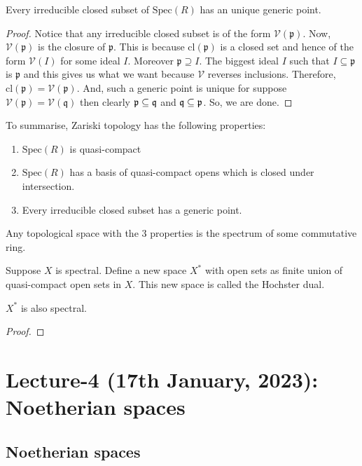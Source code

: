 \documentclass[oneside, 12pt, ]{scrbook}
\newcommand{\V}{\mathcal{V}}
\newcommand{\spec}{\mathrm{Spec}}
\newcommand{\pr}{\mathfrak{p}}
\theoremstyle{theorem}
\begin{document}
\begin{proposition}
Every irreducible closed subset of $\spec(R)$ has an unique generic point.
\end{proposition}

\begin{proof}
Notice that any irreducible closed subset is of the form $\V(\pr)$. Now, $\V(\pr)$ is the closure of $\pr$. This is because $\mathrm{cl}(\pr)$ is a closed set and hence of the form $\V(I)$ for some ideal $I$. Moreover $\pr \supseteq I$. The biggest ideal $I$ such that $I \subseteq \pr$ is $\pr$ and this gives us what we want because $\V$ reverses inclusions. Therefore, $\mathrm{cl}(\pr) = \V(\pr)$. And, such a generic point is unique for suppose $\V(\pr) = \V(\mathfrak{q})$ then clearly $\pr \subseteq \frak{q}$ and $\frak{q} \subseteq \pr$. So, we are done. 
\end{proof}

To summarise, Zariski topology has the following properties: 
\begin{enumerate}
\item $\spec(R)$ is quasi-compact
\item $\spec(R)$ has a basis of quasi-compact opens which is closed under intersection.
\item Every irreducible closed subset has a generic point.
\end{enumerate}

\begin{theorem}[Hochster]
Any topological space with the $3$ properties is the spectrum of some commutative ring.
\end{theorem}



Suppose $X$ is spectral. Define a new space $X^{*}$ with open sets as finite union of quasi-compact open sets in $X$. This new space is called the Hochster dual.

\begin{theorem}
$X^{*}$ is also spectral.
\end{theorem} 

\begin{proof}

\end{proof}


\chapter{Lecture-4 (17th January, 2023): Noetherian spaces}

\section{Noetherian spaces}
\end{document}
